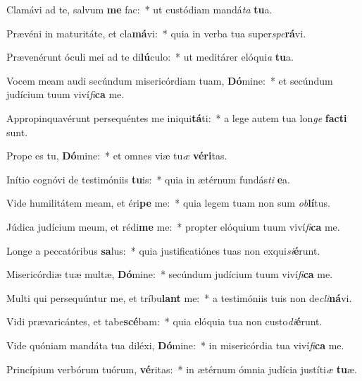 \item Clamávi ad te, salvum \textbf{me} fac:~* ut custódiam mandá\textit{ta} \textbf{tu}a.
\item Prævéni in maturitáte, et cla\textbf{má}vi:~* quia in verba tua super\textit{spe}\textbf{rá}vi.
\item Prævenérunt óculi mei ad te di\textbf{lú}culo:~* ut meditárer elóqui\textit{a} \textbf{tu}a.
\item Vocem meam audi secúndum misericórdiam tuam, \textbf{Dó}mine:~* et secúndum judícium tuum viví\textit{fi}\textbf{ca} me.
\item Appropinquavérunt persequéntes me iniqui\textbf{tá}ti:~* a lege autem tua lon\textit{ge} \textbf{fac}\textbf{ti} sunt.
\item Prope es tu, \textbf{Dó}mine:~* et omnes viæ tu\textit{æ} \textbf{vé}\textbf{ri}tas.
\item Inítio cognóvi de testimóniis \textbf{tu}is:~* quia in ætérnum fundás\textit{ti} \textbf{e}a.
\item Vide humilitátem meam, et éri\textbf{pe} me:~* quia legem tuam non sum \textit{ob}\textbf{lí}tus.
\item Júdica judícium meum, et rédi\textbf{me} me:~* propter elóquium tuum viví\textit{fi}\textbf{ca} me.
\item Longe a peccatóribus \textbf{sa}lus:~* quia justificatiónes tuas non exqui\textit{si}\textbf{é}runt.
\item Misericórdiæ tuæ multæ, \textbf{Dó}mine:~* secúndum judícium tuum viví\textit{fi}\textbf{ca} me.
\item Multi qui persequúntur me, et tríbu\textbf{lant} me:~* a testimóniis tuis non de\textit{cli}\textbf{ná}vi.
\item Vidi prævaricántes, et tabe\textbf{scé}bam:~* quia elóquia tua non custo\textit{di}\textbf{é}runt.
\item Vide quóniam mandáta tua diléxi, \textbf{Dó}mine:~* in misericórdia tua viví\textit{fi}\textbf{ca} me.
\item Princípium verbórum tuórum, \textbf{vé}ritas:~* in ætérnum ómnia judícia justíti\textit{æ} \textbf{tu}æ.
